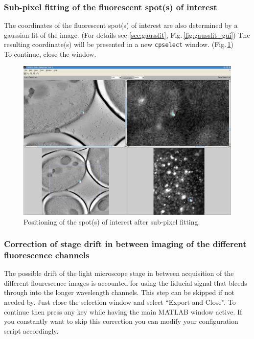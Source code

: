 \documentclass[10pt,a4paper,onepage,DIV12]{scrartcl}
\begin{document}
\subsubsection{Sub-pixel fitting of the fluorescent spot(s) of interest}
The coordinates of the fluorescent spot(s) of interest are also determined by a gaussian fit of the image. (For details see \ref{sec:gaussfit}, Fig.\,\ref{fig:gaussfit_gui}) The resulting coordinate(s) will be presented in a new \texttt{cpselect} window. (Fig.\,\ref{fig:cpsel_fluor2})\\

To continue, close the window. 



\begin{figure}
 \centering
 \includegraphics[width=.78\textwidth]{images/cpsel_fluor2.jpg}
 \caption{Positioning of the spot(s) of interest after sub-pixel fitting.}
 \label{fig:cpsel_fluor2}
\end{figure}

\subsubsection{Correction of stage drift in between imaging of the different fluorescence channels}
The possible drift of the light microscope stage in between acquisition of the different flourescence images is accounted for using the fiducial signal that bleeds through into the longer wavelength channels. This step can be skipped if not needed by. Just close the selection window and select ``Export and Close''. To continue then press any key while having the main MATLAB window active. If you constantly want to skip this correction you can modify your configuration script accordingly.\\
\end{document}

